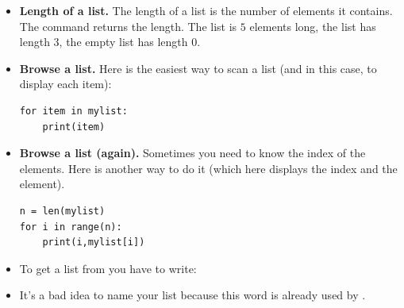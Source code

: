 \documentclass[11pt,class=report,crop=false]{standalone}
\begin{document}
\begin{cours}[List (2)]
\sauteligne
\begin{itemize}
  \item \textbf{Length of a list.} The length of a list is the number of elements it contains. The command  returns the length. The list \ci{[5,4,3,2,1]} is $5$ elements long, the list  has length $3$, the empty list \ci{[]} has length $0$.
  
  \item \textbf{Browse a list.} 
	Here is the easiest way to scan a list (and in this case, to display each item):
\begin{lstlisting}
for item in mylist:
    print(item)
\end{lstlisting}


  \item \textbf{Browse a list (again).} 
  Sometimes you need to know the index of the elements. Here is another way to do it (which here displays the index and the element).
\begin{lstlisting}
n = len(mylist)
for i in range(n):
    print(i,mylist[i])
\end{lstlisting}  

\item To get a list from  you have to write:

\item It's a bad idea to name your list \og{}\fg{} because this word is already used by \Python{}.
\end{itemize}
\end{cours}



\end{document}

